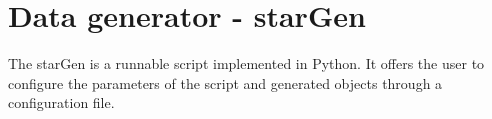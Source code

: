 \section{Data generator - starGen}

The starGen is a runnable script implemented in Python. It offers the user to configure the parameters of the script and generated objects through a configuration file.  



